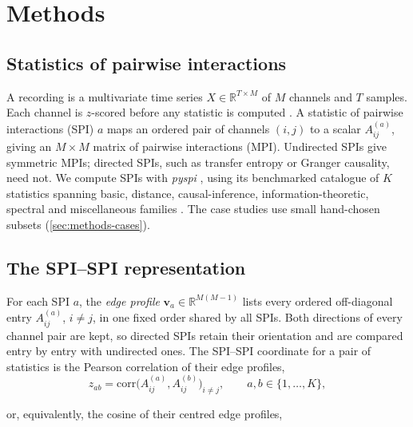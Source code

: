 \section{Methods}
\label{sec:methods}

\subsection{Statistics of pairwise interactions}
\label{sec:methods-spis}
A recording is a multivariate time series $X \in \mathbb{R}^{T \times M}$ of $M$ channels and $T$ samples. Each channel is $z$-scored before any statistic is computed . A statistic of pairwise interactions (SPI) $a$ maps an ordered pair of channels $(i,j)$ to a scalar $A^{(a)}_{ij}$, giving an $M \times M$ matrix of pairwise interactions (MPI). Undirected SPIs give symmetric MPIs; directed SPIs, such as transfer entropy or Granger causality, need not. We compute SPIs with \textit{pyspi} \cite{cliff2023unifying}, using its benchmarked catalogue of $K$ statistics spanning basic, distance, causal-inference, information-theoretic, spectral and miscellaneous families . The case studies use small hand-chosen subsets (\cref{sec:methods-cases}).

\subsection{The SPI--SPI representation}
\label{sec:methods-z}
For each SPI $a$, the \emph{edge profile} $\mathbf{v}_a \in \mathbb{R}^{M(M-1)}$ lists every ordered off-diagonal entry $A^{(a)}_{ij}$, $i \neq j$, in one fixed order shared by all SPIs. Both directions of every channel pair are kept, so directed SPIs retain their orientation and are compared entry by entry with undirected ones. The SPI--SPI coordinate for a pair of statistics is the Pearson correlation of their edge profiles,
\begin{equation}
	z_{ab} = \mathrm{corr}\Big(A_{ij}^{(a)}, A_{ij}^{(b)}\Big)_{i \neq j}, \qquad a,b \in \{1,\dots,K\},
	\label{eq:z-raw}
\end{equation}

or, equivalently, the cosine of their centred edge profiles,

